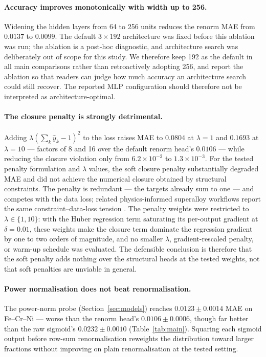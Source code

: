 \documentclass[preprint,12pt,authoryear]{elsarticle}
\begin{document}
\paragraph{Accuracy improves monotonically with width up to 256.}
Widening the hidden layers from 64 to 256 units reduces the renorm MAE from
$0.0137$ to $0.0099$. The default $3\times192$ architecture was fixed
before this ablation was run; the ablation is a post-hoc diagnostic, and
architecture search was deliberately out of scope for this study. We
therefore keep 192 as the default in all main comparisons rather than
retroactively adopting 256, and report the ablation so that readers can
judge how much accuracy an architecture search could still recover. The
reported MLP configuration should therefore not be interpreted as
architecture-optimal.

\paragraph{The closure penalty is strongly detrimental.}
Adding $\lambda(\sum_k \hat y_k - 1)^2$ to the loss raises MAE to $0.0804$
at $\lambda = 1$ and $0.1693$ at $\lambda = 10$ --- factors of 8 and 16
over the default renorm head's $0.0106$ --- while reducing
the closure violation only from $6.2\times10^{-2}$ to $1.3\times10^{-3}$.
For the tested penalty formulation and $\lambda$ values, the soft closure
penalty substantially degraded MAE and did not achieve the numerical
closure obtained by structural constraints. The penalty is redundant ---
the targets already sum to one --- and competes with the data loss; related
physics-informed superalloy workflows report the same constraint--data-loss
tension \citep{karthik2025sumrule}. The
penalty weights were restricted to $\lambda \in \{1, 10\}$: with the Huber
regression term saturating its per-output gradient at $\delta = 0.01$, these
weights make the closure term dominate the regression gradient by one to
two orders of magnitude, and no smaller $\lambda$, gradient-rescaled
penalty, or warm-up schedule was evaluated. The defensible conclusion is
therefore that the soft penalty adds nothing over the structural heads at
the tested weights, not that soft penalties are unviable in general.

\paragraph{Power normalisation does not beat renormalisation.}
The power-norm probe (Section~\ref{sec:models}) reaches $0.0123 \pm
0.0014$ MAE on Fe--Cr--Ni --- worse than the renorm head's
$0.0106 \pm 0.0006$, though far better than the raw sigmoid's
$0.0232 \pm 0.0010$ (Table~\ref{tab:main}). Squaring each sigmoid output
before row-sum renormalisation reweights the distribution toward larger
fractions without improving on plain renormalisation at the tested
setting.
\end{document}
